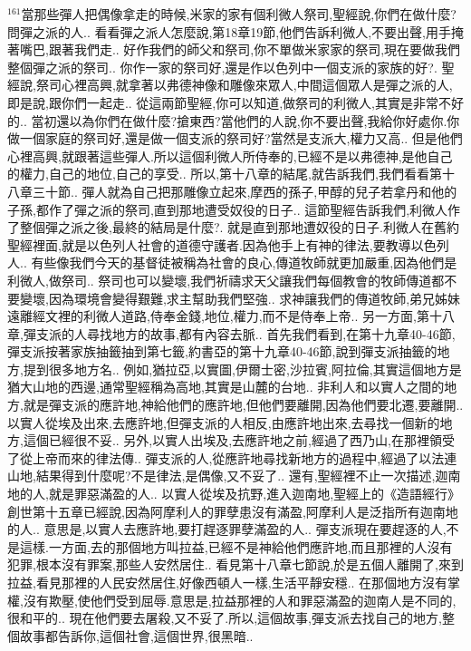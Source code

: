 \documentclass{book}
\begin{document}
$^{161}$當那些彈人把偶像拿走的時候,米家的家有個利微人祭司,聖經說,你們在做什麼?問彈之派的人..
看看彈之派人怎麼說,第18章19節,他們告訴利微人,不要出聲,用手掩著嘴巴,跟著我們走..
好作我們的師父和祭司,你不單做米家家的祭司,現在要做我們整個彈之派的祭司..
你作一家的祭司好,還是作以色列中一個支派的家族的好?.
聖經說,祭司心裡高興,就拿著以弗德神像和雕像來眾人,中間這個眾人是彈之派的人,即是說,跟你們一起走..
從這兩節聖經,你可以知道,做祭司的利微人,其實是非常不好的..
當初還以為你們在做什麼?搶東西?當他們的人說,你不要出聲,我給你好處你.你做一個家庭的祭司好,還是做一個支派的祭司好?當然是支派大,權力又高..
但是他們心裡高興,就跟著這些彈人.所以這個利微人所侍奉的,已經不是以弗德神,是他自己的權力,自己的地位,自己的享受..
所以,第十八章的結尾,就告訴我們,我們看看第十八章三十節..
彈人就為自己把那雕像立起來,摩西的孫子,甲醇的兒子若拿丹和他的子孫,都作了彈之派的祭司,直到那地遭受奴役的日子..
這節聖經告訴我們,利微人作了整個彈之派之後,最終的結局是什麼?.
就是直到那地遭奴役的日子.利微人在舊約聖經裡面,就是以色列人社會的道德守護者.因為他手上有神的律法,要教導以色列人..
有些像我們今天的基督徒被稱為社會的良心,傳道牧師就更加嚴重,因為他們是利微人,做祭司..
祭司也可以變壞,我們祈禱求天父讓我們每個教會的牧師傳道都不要變壞,因為環境會變得艱難,求主幫助我們堅強..
求神讓我們的傳道牧師,弟兄姊妹遠離經文裡的利微人道路,侍奉金錢,地位,權力,而不是侍奉上帝..
另一方面,第十八章,彈支派的人尋找地方的故事,都有內容去脈..
首先我們看到,在第十九章40-46節,彈支派按著家族抽籤抽到第七籤,約書亞的第十九章40-46節,說到彈支派抽籤的地方,提到很多地方名..
例如,猶拉亞,以實圖,伊爾士密,沙拉賓,阿拉倫,其實這個地方是猶大山地的西邊,通常聖經稱為高地,其實是山麓的台地..
非利人和以實人之間的地方,就是彈支派的應許地,神給他們的應許地,但他們要離開,因為他們要北遷,要離開..
以實人從埃及出來,去應許地,但彈支派的人相反,由應許地出來,去尋找一個新的地方,這個已經很不妥..
另外,以實人出埃及,去應許地之前,經過了西乃山,在那裡領受了從上帝而來的律法傳..
彈支派的人,從應許地尋找新地方的過程中,經過了以法連山地,結果得到什麼呢?不是律法,是偶像,又不妥了..
還有,聖經裡不止一次描述,迦南地的人,就是罪惡滿盈的人..
以實人從埃及抗野,進入迦南地,聖經上的《造語經行》創世第十五章已經說,因為阿摩利人的罪孽患沒有滿盈,阿摩利人是泛指所有迦南地的人..
意思是,以實人去應許地,要打趕逐罪孽滿盈的人..
彈支派現在要趕逐的人,不是這樣.一方面,去的那個地方叫拉益,已經不是神給他們應許地,而且那裡的人沒有犯罪,根本沒有罪案,那些人安然居住..
看見第十八章七節說,於是五個人離開了,來到拉益,看見那裡的人民安然居住,好像西頓人一樣,生活平靜安穩..
在那個地方沒有掌權,沒有欺壓,使他們受到屈辱.意思是,拉益那裡的人和罪惡滿盈的迦南人是不同的,很和平的..
現在他們要去屠殺,又不妥了.所以,這個故事,彈支派去找自己的地方,整個故事都告訴你,這個社會,這個世界,很黑暗..
\end{document}
